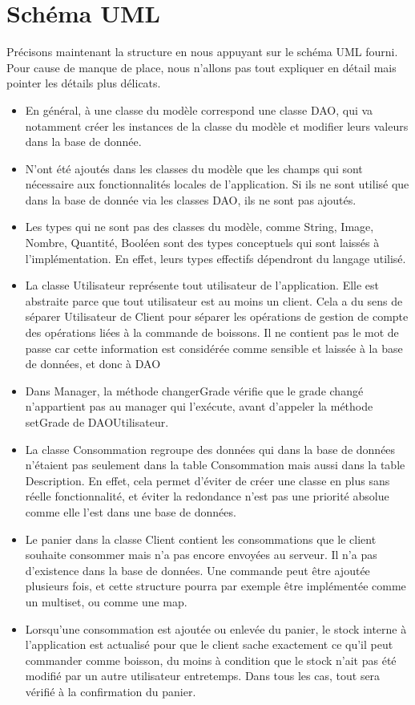\documentclass[a4paper,10pt]{article}
\begin{document}
\section{Schéma UML}

Précisons maintenant la structure en nous appuyant sur le schéma UML fourni. Pour cause de manque de place, nous n'allons pas tout expliquer en détail mais pointer les détails plus délicats.

\begin{itemize}
    \item En général, à une classe du modèle correspond une classe DAO, qui va notamment créer les instances de la classe du modèle et modifier leurs valeurs dans la base de donnée.
    \item N'ont été ajoutés dans les classes du modèle que les champs qui sont nécessaire aux fonctionnalités locales de l'application. Si ils ne sont utilisé que dans la base de donnée via les classes DAO, ils ne sont pas ajoutés.
    \item Les types qui ne sont pas des classes du modèle, comme String, Image, Nombre, Quantité, Booléen sont des types conceptuels qui sont laissés à l'implémentation. En effet, leurs types effectifs dépendront du langage utilisé.
    \item La classe Utilisateur représente tout utilisateur de l'application. Elle est abstraite parce que tout utilisateur est au moins un client. Cela a du sens de séparer Utilisateur de Client pour séparer les opérations de gestion de compte des opérations liées à la commande de boissons. Il ne contient pas le mot de passe car cette information est considérée comme sensible et laissée à la base de données, et donc à DAO
    \item Dans Manager, la méthode changerGrade vérifie que le grade changé n'appartient pas au manager qui l'exécute, avant d'appeler la méthode setGrade de DAOUtilisateur.
    \item La classe Consommation regroupe des données qui dans la base de données n'étaient pas seulement dans la table Consommation mais aussi dans la table Description. En effet, cela permet d'éviter de créer une classe en plus sans réelle fonctionnalité, et éviter la redondance n'est pas une priorité absolue comme elle l'est dans une base de données.
    \item Le panier dans la classe Client contient les consommations que le client souhaite consommer mais n'a pas encore envoyées au serveur. Il n'a pas d'existence dans la base de données. Une commande peut être ajoutée plusieurs fois, et cette structure pourra par exemple être implémentée comme un multiset, ou comme une map.
    \item Lorsqu'une consommation est ajoutée ou enlevée du panier, le stock interne à l'application est actualisé pour que le client sache exactement ce qu'il peut commander comme boisson, du moins à condition que le stock n'ait pas été modifié par un autre utilisateur entretemps. Dans tous les cas, tout sera vérifié à la confirmation du panier.
\end{itemize}
\end{document}
